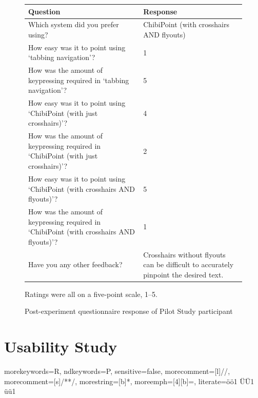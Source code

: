 \documentclass[a4paper, 12pt]{report}
\begin{document}
\begin{figure}[ht]
\renewcommand{\arraystretch}{1.5}

\begin{tabularx}{\textwidth}{X|X}
\hline\hline %
Question & Response \\ [0.5ex] %
\hline 
Which system did you prefer using?	&	ChibiPoint (with crosshairs AND flyouts)	\\
How easy was it to point using `tabbing navigation'?	&	1	\\
How was the amount of keypressing required in `tabbing navigation'?	&	5	\\
How easy was it to point using `ChibiPoint (with just crosshairs)'?	&	4	\\
How was the amount of keypressing required in `ChibiPoint (with just crosshairs)'?	&	2	\\
How easy was it to point using `ChibiPoint (with crosshairs AND flyouts)'?	&	5	\\
How was the amount of keypressing required in `ChibiPoint (with crosshairs AND flyouts)'?	&	1	\\
Have you any other feedback?	&	Crosshairs without flyouts can be difficult to accurately pinpoint the desired text.	\\
\hline %
\end{tabularx}
\caption{Post-experiment questionnaire response of Pilot Study participant}
Ratings were all on a five-point scale, 1--5.
\label{fig:partic_pilotpost}
\end{figure}

\chapter{Usability Study}


{
morekeywords={R},
ndkeywords={P},
sensitive=false,
morecomment=[l]{//},
morecomment=[s]{/*}{*/},
morestring=[b]{*},
moreemph=[4][b]{=},
literate={ö}{{\"o}}1
           {Ü}{{\"U}}1
           {ü}{{\"u}}1
}
\end{document}
